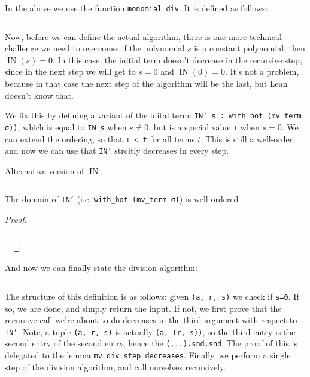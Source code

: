 \documentclass[a4paper, 12pt]{article}
\DeclareMathOperator{\IN}{IN}
\newcommand{\lean}[1]{\texttt{#1}}
\theoremstyle{changedot}
\theoremstyle{changedotbreak}
\theoremstyle{nonumberplain}
\newtheorem{proof}{Proof}
\begin{document}
In the above we use the function \lean{monomial_div}. It is defined as follows:

\inputminted[firstline=22, lastline=24]{lean}{../src/mv_division.lean}

Now, before we can define the actual algorithm, there is one more technical challenge we need to overcome: if the polynomial $s$ is a constant polynomial, then $\IN(s) = 0$. In this case, the initial term doesn't decrease in the recursive step, since in the next step we will get to $s = 0$ and $\IN(0) = 0$. It's not a problem, because in that case the next step of the algorithm will be the last, but Lean doesn't know that.

We fix this by defining a variant of the inital term: \lean{IN' s : with_bot (mv_term σ))}, which is equal to \lean{IN s} when $s \ne 0$, but is a special value \lean{⊥} when $s = 0$. We can extend the ordering, so that \lean{⊥ < t} for all terms $t$. This is still a well-order, and now we can use that \lean{IN'} strcitly decreases in every step.

\begin{definition} Alternative version of $\IN$.

  \inputminted[firstline=26, lastline=30]{lean}{../src/initial_term.lean}
\end{definition}

\begin{lemma} The domain of \lean{IN'} (i.e. \lean{with_bot (mv_term σ)}) is well-ordered
\end{lemma}
\begin{proof}
  ~
  \inputminted[firstline=105, lastline=108]{lean}{../src/monomial_order.lean}
  ~
\end{proof}

And now we can finally state the division algorithm:

\inputminted[firstline=311, lastline=330]{lean}{../src/mv_division.lean}

The structure of this definition is as follows: given \lean{(a, r, s)} we check if \lean{s=0}. If so, we are done, and simply return the input. If not, we first prove that the recursive call we're about to do decreases in the third argument with respect to \lean{IN'}. Note, a tuple \lean{(a, r, s)} is actually \lean{(a, (r, s))}, so the third entry is the second entry of the second entry, hence the \lean{(...).snd.snd}. The proof of this is delegated to the lemma \lean{mv_div_step_decreases}. Finally, we perform a single step of the division algorithm, and call ourselves recursively.
\end{document}

